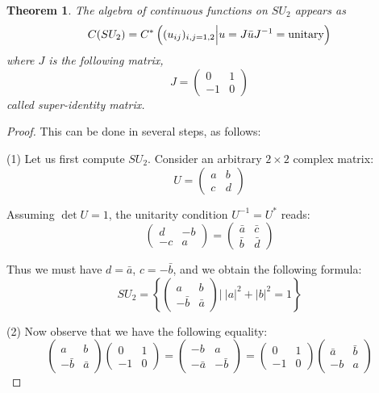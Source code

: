 \documentclass[12pt]{amsbook}
\newtheorem{theorem}{Theorem}[chapter]
\begin{document}
\begin{theorem}
The algebra of continuous functions on $SU_2$ appears as
$$C(SU_2)=C^*\left((u_{ij})_{i,j=1,2}\Big|u=J\bar{u}J^{-1}={\rm unitary}\right)$$
where $J$ is the following matrix,
$$J=\begin{pmatrix}0&1\\ -1&0\end{pmatrix}$$
called super-identity matrix. 
\end{theorem}

\begin{proof}
This can be done in several steps, as follows:

\medskip

(1) Let us first compute $SU_2$. Consider an arbitrary $2\times2$ complex matrix:
$$U=\begin{pmatrix}a&b\\c&d\end{pmatrix}$$

Assuming $\det U=1$, the unitarity condition $U^{-1}=U^*$ reads:
$$\begin{pmatrix}d&-b\\-c&a\end{pmatrix}
=\begin{pmatrix}\bar{a}&\bar{c}\\\bar{b}&\bar{d}\end{pmatrix}$$

Thus we must have $d=\bar{a}$, $c=-\bar{b}$, and we obtain the following formula:
$$SU_2=\left\{\begin{pmatrix}a&b\\-\bar{b}&\bar{a}\end{pmatrix}\Big|\ |a|^2+|b|^2=1\right\}$$

(2) Now observe that we have the following equality:
$$\begin{pmatrix}a&b\\ -\bar{b}&\bar{a}\end{pmatrix}
\begin{pmatrix}0&1\\ -1&0\end{pmatrix}
=\begin{pmatrix}-b&a\\-\bar{a}&-\bar{b}\end{pmatrix}
=\begin{pmatrix}0&1\\ -1&0\end{pmatrix}
\begin{pmatrix}\bar{a}&\bar{b}\\ -b&a\end{pmatrix}$$


\end{proof}
\end{document}
